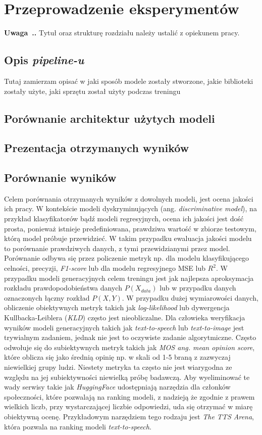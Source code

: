 \documentclass[data-science]{agh-wi} %
\newcounter{comment}[chapter]
\newenvironment{comment}[1][]{\begin{shaded}\refstepcounter{comment}
\noindent \textbf{Uwaga~\thechapter.\thecomment. #1} \rmfamily}{\end{shaded}}
\begin{document}
\chapter{Przeprowadzenie eksperymentów}
\begin{comment}
Tytuł oraz strukturę rozdziału należy ustalić z opiekunem pracy.
\end{comment}
\section{Opis \textit{pipeline-u}}
Tutaj zamierzam opisać w jaki sposób modele zostały stworzone, jakie biblioteki zostały użyte, jaki sprzętu został użyty podczas treningu
\section{Porównanie architektur użytych modeli}
\section{Prezentacja otrzymanych wyników}
\section{Porównanie wyników}
Celem porównania otrzymanych wyników z dowolnych modeli, jest ocena jakości ich pracy. W kontekście modeli dyskryminujących (ang. \textit{discriminative model}), na przykład klasyfikatorów bądź modeli regresyjnych, ocena ich jakości jest dość prosta, ponieważ istnieje predefiniowana, prawdziwa wartość w zbiorze testowym, którą model próbuje przewidzieć. W takim przypadku ewaluacja jakości modelu to porównanie prawdziwych danych, z tymi przewidzianymi przez model. Porównanie odbywa się przez policzenie metryk np. dla modelu klasyfikującego celności, precyzji, \textit{F1-score} lub dla modelu regresyjnego MSE lub $R^2$. W przypadku modeli generacyjnych celem treningu jest jak najlepsza aproksymacja rozkładu prawdopodobieństwa danych $P(X_{data})$ lub w przypadku danych oznaczonych łączny rozkład $P(X, Y)$. W przypadku dużej wymiarowości danych, obliczenie obiektywnych metryk takich jak \textit{log-likelihood} lub dywergencja Kullbacka-Leiblera (\textit{KLD}) często jest nieobliczalne. Dla człowieka weryfikacja wyników modeli generacyjnych takich jak \textit{text-to-speech} lub \textit{text-to-image} jest trywialnym zadaniem, jednak nie jest to oczywiste zadanie algorytmiczne. Często odwołuje się do subiektywnych metryk takich jak \textit{MOS ang. mean opinion score}, które oblicza się jako średnią opinię np. w skali od 1-5 braną z zazwyczaj niewielkiej grupy ludzi. Niestety metryka ta często nie jest wiarygodna ze względu na jej subiektywności niewielką próbę badawczą. Aby wyeliminować te wady serwisy takie jak \textit{HuggingFace} udostępniają narzędzia dla członków społeczności, które pozwalają na ranking modeli, z nadzieją że zgodnie z prawem wielkich liczb, przy wystarczającej liczbie odpowiedzi, uda się otrzymać w miarę obiektywną ocenę. Przykładowym narzędziem tego rodzaju jest \textit{The TTS Arena}\cite{tts_arena}, która pozwala na ranking modeli \textit{text-to-speech}.
\end{document}
